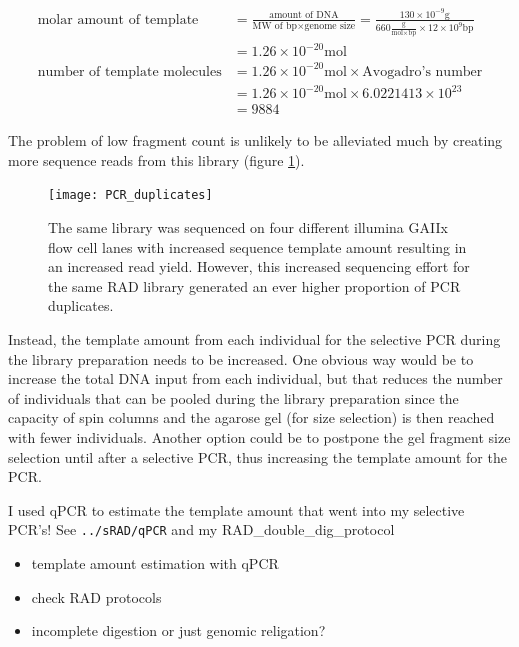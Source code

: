 \documentclass[a4paper,12pt,times,print,index, custombib]{PhDThesisPSnPDF}\usepackage[]{graphicx}\usepackage[]{color}
\begin{document}
\footnotesize
\begin{align}
\text{molar amount of template} &= \frac{\text{amount of DNA}}{\text{MW of bp} \times \text{genome size}} 
= \frac{130 \times 10^{-9}\text{g}}{660 \frac{\text{g}}{\text{mol} \times \text{bp}} \times 12 \times 10^{9} \text{bp}} \label{eq:genome_copies} \\
&= 1.26 \times 10^{-20} \text{mol} \nonumber \\[5pt]
\text{number of template molecules} &= 1.26 \times 10^{-20} \text{mol} \times \text{Avogadro's number} \nonumber \\
&= 1.26 \times 10^{-20} \text{mol} \times 6.0221413 \times 10^{23} \nonumber \\
&= 9884 \nonumber
\end{align}
\normalsize

The problem of low \gls{fragment} count is unlikely to be alleviated much by creating more sequence reads from this library (figure \ref{PCRduplicates}).

\begin{figure}
\begin{center}
\texttt{[image: PCR\_duplicates]}
\caption{The same library was sequenced on four different illumina GAIIx flow cell lanes with increased sequence template amount resulting in an increased read yield. However, this increased sequencing effort for the same RAD library generated an ever higher proportion of PCR duplicates.}
\label{PCRduplicates}
\end{center}
\end{figure}

Instead, the template amount from each individual for the selective PCR during the library preparation needs to be increased. One obvious way would be to increase the total DNA input from each individual, but that reduces the number of individuals that can be pooled during the library preparation since the capacity of spin columns and the agarose gel (for size selection) is then reached with fewer individuals. Another option could be to postpone the gel fragment size selection until after a selective PCR, thus increasing the template amount for the PCR.

I used qPCR to estimate the template amount that went into my selective PCR's! See \texttt{../sRAD/qPCR} and my RAD\_double\_dig\_protocol

\begin{itemize}
\item template amount estimation with qPCR
\item check RAD protocols
\item incomplete digestion or just genomic religation?
\end{itemize}
\end{document}
